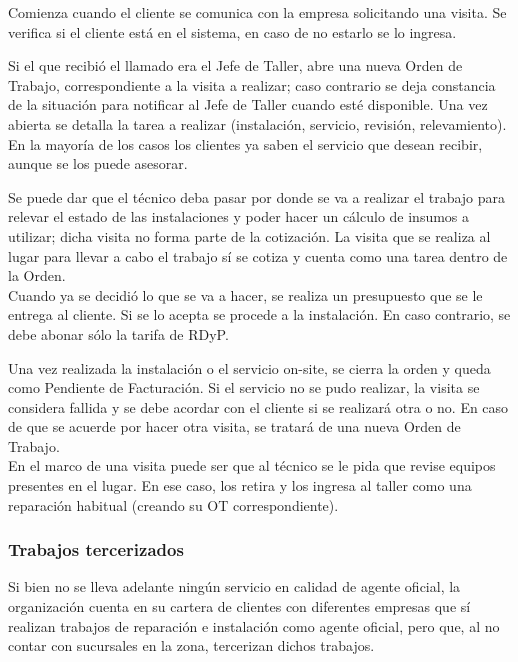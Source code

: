 \documentclass[12pt]{extarticle}
\begin{document}
\begin{spacing}{1.2}
        Comienza cuando el cliente se comunica con la empresa solicitando una visita. Se verifica si el cliente está en el sistema, en caso de no estarlo se lo ingresa.

        Si el que recibió el llamado era el Jefe de Taller, abre una nueva Orden de Trabajo, correspondiente a la visita a realizar; caso contrario se deja constancia de la situación para notificar al Jefe de Taller cuando esté disponible. 
        Una vez abierta se detalla la tarea a realizar (instalación, servicio, revisión, relevamiento). En la mayoría de los casos los clientes ya saben el servicio que desean recibir, aunque se los puede asesorar.

        Se puede dar que el técnico deba pasar por donde se va a realizar el trabajo para relevar el estado de las instalaciones y poder hacer un cálculo de insumos a utilizar; dicha visita no forma parte de la cotización. La visita que se realiza al lugar para llevar a cabo el trabajo sí se cotiza y cuenta como una tarea dentro de la Orden.\\

        Cuando ya se decidió lo que se va a hacer, se realiza un presupuesto que se le entrega al cliente. Si se lo acepta se procede a la instalación. En caso contrario, se debe abonar sólo la tarifa de RDyP.

        Una vez realizada la instalación o el servicio on-site, se cierra la orden y queda como Pendiente de Facturación. Si el servicio no se pudo realizar, la visita se considera fallida y se debe acordar con el cliente si se realizará otra o no. En caso de que se acuerde por hacer otra visita, se tratará de una nueva Orden de Trabajo.\\ 

        En el marco de una visita puede ser que al técnico se le pida que revise equipos presentes en el lugar. En ese caso, los retira y los ingresa al taller como una reparación habitual (creando su OT correspondiente).

        \subsubsection{Trabajos tercerizados}
        Si bien no se lleva adelante ningún servicio en calidad de agente oficial, la organización cuenta en su cartera de clientes con diferentes empresas que sí realizan trabajos de reparación e instalación como agente oficial, pero que, al no contar con sucursales en la zona, tercerizan dichos trabajos.


\end{spacing}
\end{document}
